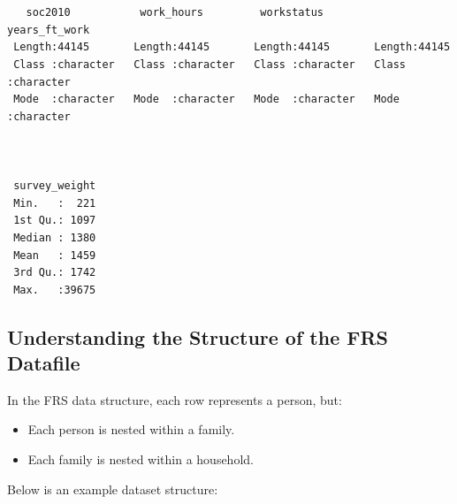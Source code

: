\documentclass[
  letterpaper,
  DIV=11,
  numbers=noendperiod]{scrreprt}
\providecommand{\tightlist}{%
  \setlength{\itemsep}{0pt}\setlength{\parskip}{0pt}}\usepackage{longtable,booktabs,array}
\begin{document}
\begin{verbatim}
                                                                            
                                                                            
   soc2010           work_hours         workstatus        years_ft_work     
 Length:44145       Length:44145       Length:44145       Length:44145      
 Class :character   Class :character   Class :character   Class :character  
 Mode  :character   Mode  :character   Mode  :character   Mode  :character  
                                                                            
                                                                            
                                                                            
 survey_weight  
 Min.   :  221  
 1st Qu.: 1097  
 Median : 1380  
 Mean   : 1459  
 3rd Qu.: 1742  
 Max.   :39675  
\end{verbatim}

\subsection{Understanding the Structure of the FRS
Datafile}\label{understanding-the-structure-of-the-frs-datafile}

In the FRS data structure, each row represents a person, but:

\begin{itemize}
\tightlist
\item
  Each person is nested within a family.
\item
  Each family is nested within a household.
\end{itemize}

Below is an example dataset structure:
\end{document}
